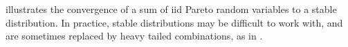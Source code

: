  illustrates the
convergence of a sum of iid Pareto random
variables to a stable distribution. In practice,
stable distributions may be difficult to work
with, and are sometimes replaced by heavy tailed
combinations, as in .
%
%
%
%
%
